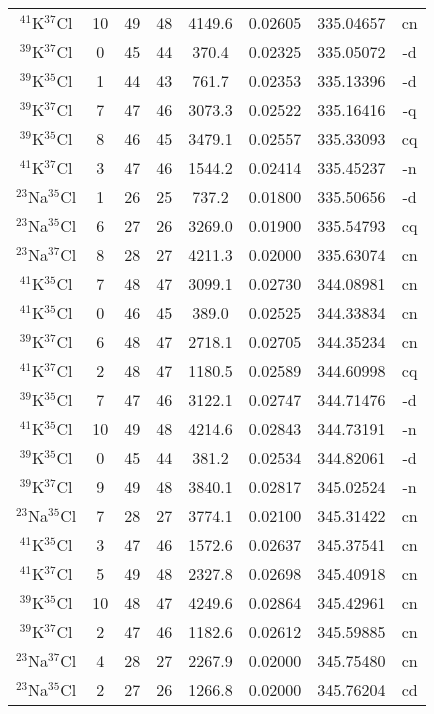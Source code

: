 \begin{table*}[htp]
\begin{tabular}{cccccccc}
$^{41}$K$^{37}$Cl & 10 & 49 & 48 & 4149.6 & 0.02605 & 335.04657 & cn \\
$^{39}$K$^{37}$Cl & 0 & 45 & 44 & 370.4 & 0.02325 & 335.05072 & -d \\
$^{39}$K$^{35}$Cl & 1 & 44 & 43 & 761.7 & 0.02353 & 335.13396 & -d \\
$^{39}$K$^{37}$Cl & 7 & 47 & 46 & 3073.3 & 0.02522 & 335.16416 & -q \\
$^{39}$K$^{35}$Cl & 8 & 46 & 45 & 3479.1 & 0.02557 & 335.33093 & cq \\
$^{41}$K$^{37}$Cl & 3 & 47 & 46 & 1544.2 & 0.02414 & 335.45237 & -n \\
$^{23}$Na$^{35}$Cl & 1 & 26 & 25 & 737.2 & 0.01800 & 335.50656 & -d \\
$^{23}$Na$^{35}$Cl & 6 & 27 & 26 & 3269.0 & 0.01900 & 335.54793 & cq \\
$^{23}$Na$^{37}$Cl & 8 & 28 & 27 & 4211.3 & 0.02000 & 335.63074 & cn \\
$^{41}$K$^{35}$Cl & 7 & 48 & 47 & 3099.1 & 0.02730 & 344.08981 & cn \\
$^{41}$K$^{35}$Cl & 0 & 46 & 45 & 389.0 & 0.02525 & 344.33834 & cn \\
$^{39}$K$^{37}$Cl & 6 & 48 & 47 & 2718.1 & 0.02705 & 344.35234 & cn \\
$^{41}$K$^{37}$Cl & 2 & 48 & 47 & 1180.5 & 0.02589 & 344.60998 & cq \\
$^{39}$K$^{35}$Cl & 7 & 47 & 46 & 3122.1 & 0.02747 & 344.71476 & -d \\
$^{41}$K$^{35}$Cl & 10 & 49 & 48 & 4214.6 & 0.02843 & 344.73191 & -n \\
$^{39}$K$^{35}$Cl & 0 & 45 & 44 & 381.2 & 0.02534 & 344.82061 & -d \\
$^{39}$K$^{37}$Cl & 9 & 49 & 48 & 3840.1 & 0.02817 & 345.02524 & -n \\
$^{23}$Na$^{35}$Cl & 7 & 28 & 27 & 3774.1 & 0.02100 & 345.31422 & cn \\
$^{41}$K$^{35}$Cl & 3 & 47 & 46 & 1572.6 & 0.02637 & 345.37541 & cn \\
$^{41}$K$^{37}$Cl & 5 & 49 & 48 & 2327.8 & 0.02698 & 345.40918 & cn \\
$^{39}$K$^{35}$Cl & 10 & 48 & 47 & 4249.6 & 0.02864 & 345.42961 & cn \\
$^{39}$K$^{37}$Cl & 2 & 47 & 46 & 1182.6 & 0.02612 & 345.59885 & cn \\
$^{23}$Na$^{37}$Cl & 4 & 28 & 27 & 2267.9 & 0.02000 & 345.75480 & cn \\
$^{23}$Na$^{35}$Cl & 2 & 27 & 26 & 1266.8 & 0.02000 & 345.76204 & cd \\

\end{tabular}
\end{table*}
